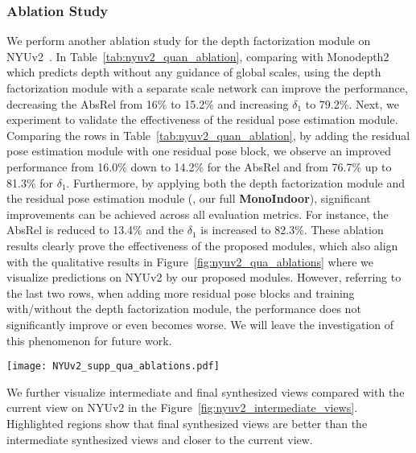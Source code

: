 \subsubsection{Ablation Study}
We perform another ablation study for the depth factorization module on NYUv2~\cite{Silberman:ECCV12}. In Table~\ref{tab:nyuv2_quan_ablation}, comparing with Monodepth2 which predicts depth without any guidance of global scales, using the depth factorization module with a separate scale network can improve the performance, decreasing the AbsRel from 16\% to 15.2\% and increasing $\delta_1$ to 79.2\%. Next, we experiment to validate the effectiveness of the residual pose estimation module. Comparing the rows in Table~\ref{tab:nyuv2_quan_ablation}, by adding the residual pose estimation module with one residual pose block, we observe an improved performance from 16.0\% down to 14.2\% for the AbsRel and from 76.7\% up to 81.3\% for $\delta_1$. Furthermore, by applying both the depth factorization module and the residual pose estimation module (\ie, our full \textbf{MonoIndoor}), significant improvements can be achieved across all evaluation metrics. For instance, the AbsRel is reduced to 13.4\% and the $\delta_1$ is increased to 82.3\%. These ablation results clearly prove the effectiveness of the proposed modules, which also align with the qualitative results in Figure~\ref{fig:nyuv2_qua_ablations} where we visualize predictions on NYUv2 by our proposed modules. However, referring to the last two rows, when adding more residual pose blocks and training with/without the depth factorization module, the performance does not significantly improve or even becomes worse. We will leave the investigation of this phenomenon for future work.


\begin{figure*}[h]
\begin{center}
\texttt{[image: NYUv2\_supp\_qua\_ablations.pdf]}
\end{center}
\caption{Qualitative ablation comparisons of depth prediction on NYUv2. Our full model with both depth factorization and residual pose modules produce better depth maps.}
\label{fig:nyuv2_qua_ablations}
\end{figure*}

We further visualize intermediate and final synthesized views compared with the current view on NYUv2 in the Figure~\ref{fig:nyuv2_intermediate_views}. Highlighted regions show that final synthesized views are better than the intermediate synthesized views and closer to the current view.

